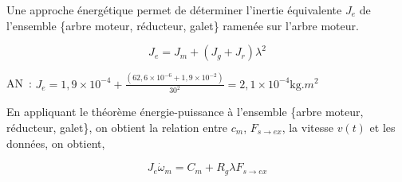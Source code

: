 \begin{texteCache}
 
 \vspace{3.5cm}

\end{texteCache}
\else

Une approche énergétique permet de déterminer l'inertie  équivalente \(J_{e}\) de l'ensemble \{arbre moteur, réducteur, galet\} ramenée sur l'arbre moteur.

\[J_{e} = J_{m} + \left( J_{g} + J_{r} \right)\lambda^{2}\]



\fi


\ifprof
\begin{texteCache}

AN~:
\(J_{e} = 1,9 \times 10^{- 4} + \frac{\left( 62,6 \times 10^{- 6} + 1,9 \times 10^{- 2} \right)}{30^{2}} = 2,1 \times 10^{- 4}\text{kg.}m^{2}\)
 
 \vspace{1.5cm}

\end{texteCache}
\else


 En appliquant le théorème énergie-puissance à l'ensemble \{arbre moteur, réducteur, galet\}, on obtient la relation entre \(c_{m}\),
  \(F_{s \rightarrow ex}\), la vitesse \(v(t)\) et les données, on obtient,


$$J_{e}{\dot{\omega}}_{m} =C_{m} + R_{g}\lambda F_{s \rightarrow ex}$$

\fi


